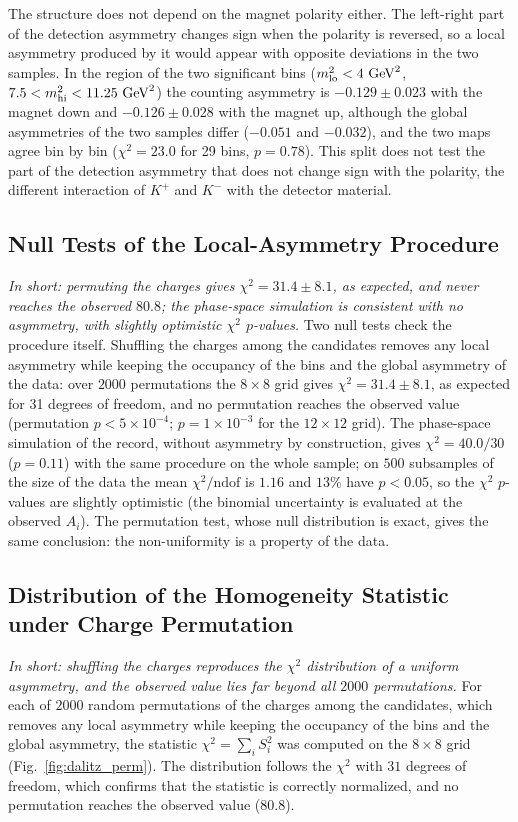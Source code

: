 The structure does not depend on the magnet polarity either. The left-right part of the detection asymmetry changes sign when the polarity is reversed, so a local asymmetry produced by it would appear with opposite deviations in the two samples. In the region of the two significant bins ($m^2_{\mathrm{lo}}<4\,\,\text{Ge\hspace{-.08em}V}^2$, $7.5<m^2_{\mathrm{hi}}<11.25\,\,\text{Ge\hspace{-.08em}V}^2$) the counting asymmetry is $-0.129\pm0.023$ with the magnet down and $-0.126\pm0.028$ with the magnet up, although the global asymmetries of the two samples differ ($-0.051$ and $-0.032$), and the two maps agree bin by bin ($\chi^2=23.0$ for 29 bins, $p=0.78$). This split does not test the part of the detection asymmetry that does not change sign with the polarity, the different interaction of $K^+$ and $K^-$ with the detector material.

\subsection{Null Tests of the Local-Asymmetry Procedure}
\label{sec:dalitz_null}
\emph{In short: permuting the charges gives $\chi^2=31.4\pm8.1$, as expected, and never reaches the observed $80.8$; the phase-space simulation is consistent with no asymmetry, with slightly optimistic $\chi^2$ $p$-values.}
Two null tests check the procedure itself. Shuffling the charges among the candidates removes any local asymmetry while keeping the occupancy of the bins and the global asymmetry of the data: over $2000$ permutations the $8\times8$ grid gives $\chi^2=31.4\pm8.1$, as expected for 31 degrees of freedom, and no permutation reaches the observed value (permutation $p<5\times10^{-4}$; $p=1\times10^{-3}$ for the $12\times12$ grid). The phase-space simulation of the record, without asymmetry by construction, gives $\chi^2=40.0/30$ ($p=0.11$) with the same procedure on the whole sample; on $500$ subsamples of the size of the data the mean $\chi^2/\mathrm{ndof}$ is $1.16$ and $13\%$ have $p<0.05$, so the $\chi^2$ $p$-values are slightly optimistic (the binomial uncertainty is evaluated at the observed $A_i$). The permutation test, whose null distribution is exact, gives the same conclusion: the non-uniformity is a property of the data.

\subsection{Distribution of the Homogeneity Statistic under Charge Permutation}
\label{app:dalitz_perm}
\emph{In short: shuffling the charges reproduces the $\chi^2$ distribution of a uniform asymmetry, and the observed value lies far beyond all $2000$ permutations.}
For each of $2000$ random permutations of the charges among the candidates, which removes any local asymmetry while keeping the occupancy of the bins and the global asymmetry, the statistic $\chi^2=\sum_iS_i^2$ was computed on the $8\times8$ grid (Fig.~\ref{fig:dalitz_perm}). The distribution follows the $\chi^2$ with $31$ degrees of freedom, which confirms that the statistic is correctly normalized, and no permutation reaches the observed value ($80.8$).

